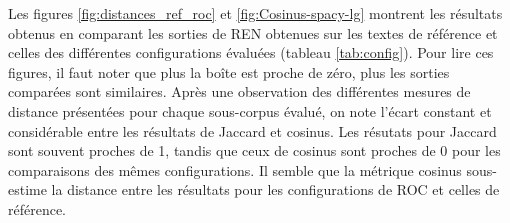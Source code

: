 Les figures \ref{fig:distances_ref_roc} et \ref{fig:Cosinus-spacy-lg} montrent les résultats obtenus en comparant les sorties de REN obtenues sur les textes de référence et celles des différentes configurations évaluées (tableau \ref{tab:config}). Pour lire ces figures, il faut noter que plus la boîte est proche de zéro, plus les sorties comparées sont similaires.
Après une observation des différentes mesures de distance présentées pour chaque sous-corpus évalué, on note l'écart constant et considérable entre les résultats de Jaccard et cosinus. Les résutats pour Jaccard sont souvent proches de 1, tandis que ceux de cosinus sont proches de 0 pour les comparaisons des mêmes configurations. Il semble que la métrique cosinus sous-estime la distance entre les résultats pour les configurations de ROC et celles de référence. 

